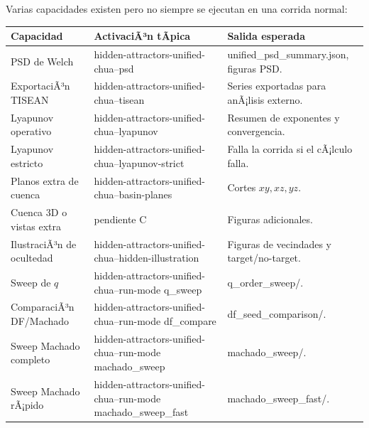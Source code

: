 \documentclass[11pt]{article}
\DeclareRobustCommand{\codepath}[1]{\begingroup\Urlmuskip=0mu plus 2mu\path{#1}\endgroup}
\def\codepath#1{#1}%
\begin{document}
Varias capacidades existen pero no siempre se ejecutan en una corrida normal:
\begin{center}
\small
\begin{tabular}{@{}L{0.30\textwidth}L{0.36\textwidth}L{0.24\textwidth}@{}}
\toprule
Capacidad & ActivaciÃ³n tÃ­pica & Salida esperada\\
\midrule
PSD de Welch & \codepath{hidden-attractors-unified-chua}\newline\codepath{--psd} & \codepath{unified_psd_summary.json}, figuras PSD.\\
ExportaciÃ³n TISEAN & \codepath{hidden-attractors-unified-chua}\newline\codepath{--tisean} & Series exportadas para anÃ¡lisis externo.\\
Lyapunov operativo & \codepath{hidden-attractors-unified-chua}\newline\codepath{--lyapunov} & Resumen de exponentes y convergencia.\\
Lyapunov estricto & \codepath{hidden-attractors-unified-chua}\newline\codepath{--lyapunov-strict} & Falla la corrida si el cÃ¡lculo falla.\\
Planos extra de cuenca & \codepath{hidden-attractors-unified-chua}\newline\codepath{--basin-planes} & Cortes \(xy,xz,yz\).\\
Cuenca 3D o vistas extra & \codepath{pendiente C} & Figuras adicionales.\\
IlustraciÃ³n de ocultedad & \codepath{hidden-attractors-unified-chua}\newline\codepath{--hidden-illustration} & Figuras de vecindades y target/no-target.\\
Sweep de \(q\) & \codepath{hidden-attractors-unified-chua}\newline\codepath{--run-mode q_sweep} & \codepath{q_order_sweep/}.\\
ComparaciÃ³n DF/Machado & \codepath{hidden-attractors-unified-chua}\newline\codepath{--run-mode df_compare} & \codepath{df_seed_comparison/}.\\
Sweep Machado completo & \codepath{hidden-attractors-unified-chua}\newline\codepath{--run-mode machado_sweep} & \codepath{machado_sweep/}.\\
Sweep Machado rÃ¡pido & \codepath{hidden-attractors-unified-chua}\newline\codepath{--run-mode machado_sweep_fast} & \codepath{machado_sweep_fast/}.\\
\bottomrule
\end{tabular}
\end{center}
\end{document}
